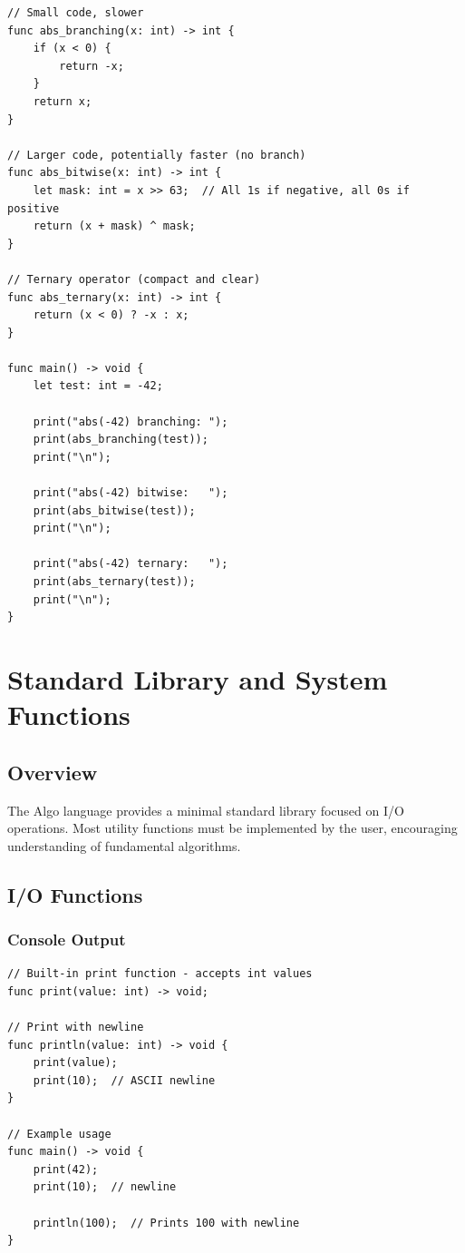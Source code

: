 \documentclass[12pt,a4paper,oneside]{book}
\begin{document}
\begin{lstlisting}[style=algo, caption={Optimization Strategy}]
// Small code, slower
func abs_branching(x: int) -> int {
    if (x < 0) {
        return -x;
    }
    return x;
}

// Larger code, potentially faster (no branch)
func abs_bitwise(x: int) -> int {
    let mask: int = x >> 63;  // All 1s if negative, all 0s if positive
    return (x + mask) ^ mask;
}

// Ternary operator (compact and clear)
func abs_ternary(x: int) -> int {
    return (x < 0) ? -x : x;
}

func main() -> void {
    let test: int = -42;
    
    print("abs(-42) branching: ");
    print(abs_branching(test));
    print("\n");
    
    print("abs(-42) bitwise:   ");
    print(abs_bitwise(test));
    print("\n");
    
    print("abs(-42) ternary:   ");
    print(abs_ternary(test));
    print("\n");
}
\end{lstlisting}

\chapter{Standard Library and System Functions}

\section{Overview}

The Algo language provides a minimal standard library focused on I/O operations. Most utility functions must be implemented by the user, encouraging understanding of fundamental algorithms.

\section{I/O Functions}

\subsection{Console Output}

\begin{lstlisting}[style=algo, caption={Standard Output Functions}]
// Built-in print function - accepts int values
func print(value: int) -> void;

// Print with newline
func println(value: int) -> void {
    print(value);
    print(10);  // ASCII newline
}

// Example usage
func main() -> void {
    print(42);
    print(10);  // newline
    
    println(100);  // Prints 100 with newline
}
\end{lstlisting}
\end{document}
